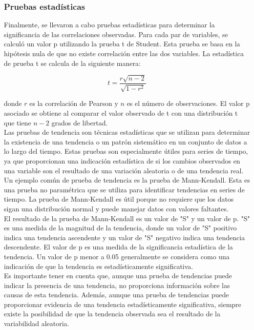 {\subsubsection{Pruebas estadísticas}

Finalmente, se llevaron a cabo pruebas estadísticas para determinar la significancia de las correlaciones observadas. Para cada par de variables, se calculó un valor p utilizando la prueba t de Student. Esta prueba se basa en la hipótesis nula de que no existe correlación entre las dos variables. La estadística de prueba t se calcula de la siguiente manera:

\begin{equation}
t = \frac{r \sqrt{n-2}}{\sqrt{1-r^2}}
\end{equation}

donde $r$ es la correlación de Pearson y $n$ es el número de observaciones. El valor p asociado se obtiene al comparar el valor observado de t con una distribución t que tiene $n-2$ grados de libertad.\\

Las pruebas de tendencia son técnicas estadísticas que se utilizan para determinar la existencia de una tendencia o un patrón sistemático en un conjunto de datos a lo largo del tiempo. Estas pruebas son especialmente útiles para series de tiempo, ya que proporcionan una indicación estadística de si los cambios observados en una variable son el resultado de una variación aleatoria o de una tendencia real.\\

Un ejemplo común de prueba de tendencia es la prueba de Mann-Kendall. Esta es una prueba no paramétrica que se utiliza para identificar tendencias en series de tiempo. La prueba de Mann-Kendall es útil porque no requiere que los datos sigan una distribución normal y puede manejar datos con valores faltantes.\\

El resultado de la prueba de Mann-Kendall es un valor de "S" y un valor de p. "S" es una medida de la magnitud de la tendencia, donde un valor de "S" positivo indica una tendencia ascendente y un valor de "S" negativo indica una tendencia descendente. El valor de p es una medida de la significancia estadística de la tendencia. Un valor de p menor a 0.05 generalmente se considera como una indicación de que la tendencia es estadísticamente significativa.\\

Es importante tener en cuenta que, aunque una prueba de tendencias puede indicar la presencia de una tendencia, no proporciona información sobre las causas de esta tendencia. Además, aunque una prueba de tendencias puede proporcionar evidencia de una tendencia estadísticamente significativa, siempre existe la posibilidad de que la tendencia observada sea el resultado de la variabilidad aleatoria.\\



}
